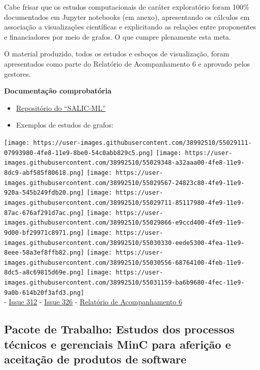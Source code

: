 Cabe frisar que os estudos computacionais de caráter exploratório foram
100\% documentados em Jupyter notebooks (em anexo), apresentando os
cálculos em associação a visualizações científicas e explicitando as
relações entre proponentes e financiadores por meio de grafos. O que
cumpre plenamente esta meta.

O material produzido, todos os estudos e esboços de visualização, foram
apresentados como parte do Relatório de Acompanhamento 6 e aprovado
pelos gestores.

\textbf{Documentação comprobatória}

\begin{itemize}
\tightlist
\item
  \href{https://github.com/lappis-unb/salic-ml/}{Repositório do
  ``SALIC-ML''}
\item
  Exemplos de estudos de grafos:
\end{itemize}

\texttt{[image: https://user-images.githubusercontent.com/38992510/55029111-07993980-4fe8-11e9-8be0-54c0abb829c5.png]}
\texttt{[image: https://user-images.githubusercontent.com/38992510/55029348-a32aaa00-4fe8-11e9-8dc9-abf585f80618.png]}
\texttt{[image: https://user-images.githubusercontent.com/38992510/55029567-24823c80-4fe9-11e9-920a-545b249fdb20.png]}
\texttt{[image: https://user-images.githubusercontent.com/38992510/55029711-85117980-4fe9-11e9-87ac-676af291d7ac.png]}
\texttt{[image: https://user-images.githubusercontent.com/38992510/55029866-e9ccd400-4fe9-11e9-9d00-bf29971c8971.png]}
\texttt{[image: https://user-images.githubusercontent.com/38992510/55030330-eede5300-4fea-11e9-8eee-58a3ef8ffb82.png]}
\texttt{[image: https://user-images.githubusercontent.com/38992510/55030556-68764100-4feb-11e9-8dc5-a8c69815d69e.png]}
\texttt{[image: https://user-images.githubusercontent.com/38992510/55031159-ba6b9680-4fec-11e9-9a0b-614b20f3afd3.png]}\\
- \href{https://github.com/lappis-unb/salic-ml/issues/312}{Issue 312} -
\href{https://github.com/lappis-unb/salic-ml/issues/326}{Issue 326} -
\href{https://github.com/lappis-unb/EcossistemasSWLivre/blob/master/Relatorios/R6/}{Relatório
de Acompanhamento 6}

\hypertarget{pacote-de-trabalho-estudos-dos-processos-tuxe9cnicos-e-gerenciais-minc-para-aferiuxe7uxe3o-e-aceitauxe7uxe3o-de-produtos-de-software}{%
\subsection{Pacote de Trabalho: Estudos dos processos técnicos e
gerenciais MinC para aferição e aceitação de produtos de
software}\label{pacote-de-trabalho-estudos-dos-processos-tuxe9cnicos-e-gerenciais-minc-para-aferiuxe7uxe3o-e-aceitauxe7uxe3o-de-produtos-de-software}}

